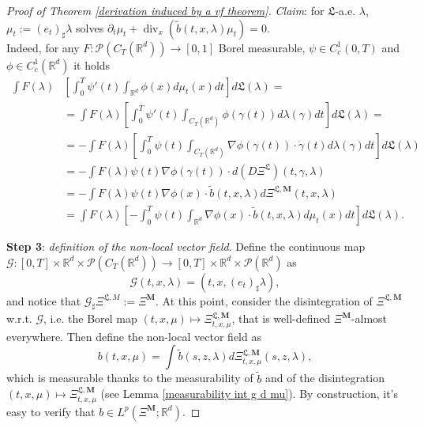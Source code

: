 \documentclass[10pt,leqno]{amsart}
\numberwithin{equation}{section}
\newcommand{\R}{\mathbb{R}}
\newcommand{\PP}{\mathcal{P}}
\begin{document}
\begin{proof}[Proof of Theorem \ref{derivation induced by a vf theorem}]
    \textit{Claim}: for $\mathfrak{L}$-a.e. $\lambda$, $\mu_t:=(e_t)_\sharp \lambda$ solves $\partial_t\mu_t + \operatorname{div}_x(\tilde{b}(t,x,\lambda) \mu_t) = 0$.
    \\
    Indeed, for any $F:\PP(C_T(\R^d))\to [0,1]$ Borel measurable, $\psi \in C_c^1(0,T)$ and $\phi\in C_c^1(\R^d)$ it holds
    \begin{align*}
        \int F(\lambda) & \left[\int_0^T\psi'(t) \int_{\R^d}\phi(x) d\mu_t(x) dt\right]d\mathfrak{L}(\lambda) = 
        \\
        & = 
        \int F(\lambda)  \left[\int_0^T\psi'(t) \int_{C_T(\R^d)}\phi(\gamma(t)) d\lambda(\gamma) dt\right]d\mathfrak{L}(\lambda) = 
        \\
        & = 
        - \int F(\lambda) \left[\int_0^T\psi(t) \int_{C_T(\R^d)}\nabla\phi(\gamma(t))\cdot \dot\gamma(t) d\lambda(\gamma) dt\right]d\mathfrak{L}(\lambda) 
        \\
        & = 
        - \int F(\lambda) \psi(t) \nabla\phi(\gamma(t))\cdot 
        d\left(D  \Xi^{\mathfrak{L}} \right)(t,\gamma,\lambda)
        \\
        & = 
        - \int F(\lambda) \psi(t) \nabla\phi(x)\cdot \tilde{b}(t,x,\lambda)
        d\Xi^{\mathfrak{L},\boldsymbol{M}} (t,x,\lambda)
        \\
        & = 
        \int F(\lambda) \left[-
        \int_0^T \psi(t) \int_{\R^d} \nabla \phi(x) \cdot \tilde{b}(t,x,\lambda) d\mu_t(x) dt \right] d\mathfrak{L}(\lambda).
    \end{align*}

\textbf{Step 3}: \textit{definition of the non-local vector field}. Define the continuous map $\mathcal{G}:[0,T]\times \R^d \times \PP(C_T(\R^d)) \to [0,T]\times \R^d \times \PP(\R^d)$ as
    \[\mathcal{G}(t,x,\lambda) = (t,x,(e_t)_\sharp \lambda),\]
    and notice that $\mathcal{G}_\sharp \Xi^{\mathfrak{L},M} := \Xi^{\boldsymbol{M}}$.
    At this point, consider the disintegration of $\Xi^{\mathfrak{L},\boldsymbol{M}}$ w.r.t. $\mathcal{G}$, i.e. the Borel map $(t,x,\mu) \mapsto \Xi^{\mathfrak{L},\boldsymbol{M}}_{t,x,\mu}$, that is well-defined $\Xi^{\boldsymbol{M}}$-almost everywhere. Then define the non-local vector field as
    \[b(t,x,\mu) = \int \tilde{b}(s,z,\lambda) d\Xi^{\mathfrak{L},\boldsymbol{M}}_{t,x,\mu}(s,z,\lambda),\]
    which is measurable thanks to the measurability of $\tilde{b}$ and of the disintegration $(t,x,\mu) \mapsto \Xi^{\mathfrak{L},\boldsymbol{M}}_{t,x,\mu}$ (see Lemma \ref{measurability int g d mu}). By construction, it's easy to verify that $b\in L^p(\Xi^{\boldsymbol{M}};\R^d)$.


\end{proof}
\end{document}
